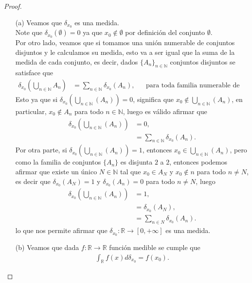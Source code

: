 \begin{proof}
  \begin{enumerate}
    \item[(a)] Veamos que $\delta_{x_0}$ es una medida.\\
      Note que $\delta_{x_0}(\emptyset)=0$ ya que $x_0\notin \emptyset$ por definición del conjunto $\emptyset$.\\
      Por otro lado, veamos que si tomamos una unión numerable de conjuntos disjuntos y le calculamos su medida, esto va a ser igual que la suma de la medida de cada conjunto, es decir, dados $\{A_{n}\}_{n\in\mathbb{N}}$ conjuntos disjuntos se satisface que
      \begin{align*}
        \delta_{x_0}\left( \bigcup_{n\in\mathbb{N}}A_{n} \right)&=\sum_{n\in\mathbb{N}}\delta_{x_0}\left( A_{n} \right), &&\text{para toda familia numerable de conjuntos disjuntos.}
      \end{align*}
      Esto ya que si $\delta_{x_0}\left( \bigcup_{n\in\mathbb{N}}(A_{n}) \right)=0$, significa que $x_0\notin \bigcup_{n\in\mathbb{N}}(A_{n})$, en particular, $x_0\notin A_{n}$ para todo $n\in\mathbb{N}$, luego es válido afirmar que
      \begin{align*}
        \delta_{x_0}\left( \bigcup_{n\in\mathbb{N}}(A_{n}) \right)&=0,\\
        &=\sum_{n\in\mathbb{N}}\delta_{x_0}(A_{n}).
      \end{align*}
      Por otra parte, si $\delta_{x_0}\left( \bigcup_{n\in\mathbb{N}}(A_{n}) \right)=1$, entonces $x_0\in \bigcup_{n\in\mathbb{N}}(A_{n})$, pero como la familia de conjuntos $\{A_{n}\}$ es disjunta $2$ a $2$, entonces podemos afirmar que existe un único $N\in\mathbb{N}$ tal que $x_0\in A_N$ y $x_0\notin n$ para todo $n\neq N$, es decir que $\delta_{x_0}(A_{N})=1$ y $\delta_{x_0}(A_{n})=0$ para todo $n\neq N$, luego
      \begin{align*}
        \delta_{x_0}\left( \bigcup_{n\in\mathbb{N}}(A_{n}) \right)&=1,\\
        &=\delta_{x_0}(A_{N}),\\
        &=\sum_{n\in N}\delta_{x_0}(A_{n}).
      \end{align*}
      lo que nos permite afirmar que $\delta_{x_0}:\mathbb{R}\to[0,+\infty]$ es una medida.
    \item[(b)] Veamos que dada $f:\mathbb{R}\to\mathbb{R}$ función medible se cumple que
      \begin{align*}
        \int_{\mathbb{R}} f(x) d \delta_{x_0}=f\left(x_0\right).

\end{align*}
\end{enumerate}
\end{proof}
